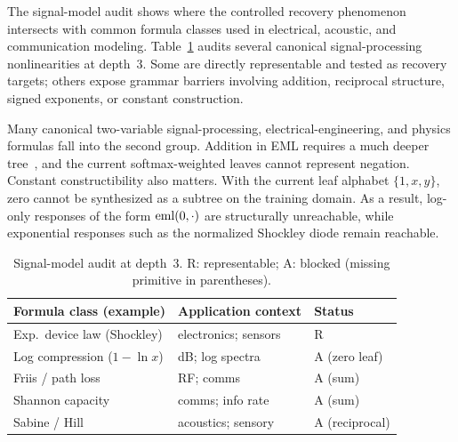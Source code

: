 The signal-model audit shows where the controlled recovery
phenomenon intersects with common formula classes used in
electrical, acoustic, and communication modeling.
Table~\ref{tab:audit} audits several canonical signal-processing
nonlinearities at depth~3.  Some are directly representable and
tested as recovery targets; others expose grammar barriers
involving addition, reciprocal structure, signed exponents, or
constant construction.

Many canonical two-variable signal-processing,
electrical-engineering, and physics formulas fall
into the second group.  Addition in EML requires a much deeper
tree~\citep{Odrzywolek2026eml}, and the current
softmax-weighted leaves cannot represent negation.  Constant
constructibility also matters.  With the current leaf alphabet
$\{1,x,y\}$, zero cannot be synthesized as a subtree on the
training domain.  As a result, log-only responses of the form
$\mathrm{eml}(0,\cdot)$ are structurally unreachable, while exponential
responses such as the normalized Shockley diode remain
reachable.

\begin{table}[t]
\centering
\caption{Signal-model audit at depth~3.  R: representable;
A: blocked (missing primitive in parentheses).}
\label{tab:audit}
\footnotesize
\begin{tabular}{@{}lll@{}}
\toprule
Formula class (example) & Application context & Status \\
\midrule
Exp.\ device law (Shockley) & electronics; sensors & R \\
Log compression ($1-\ln x$) & dB; log spectra      & A (zero leaf) \\
Friis / path loss           & RF; comms            & A (sum) \\
Shannon capacity            & comms; info rate     & A (sum) \\
Sabine / Hill               & acoustics; sensory   & A (reciprocal) \\
\bottomrule
\end{tabular}
\end{table}
